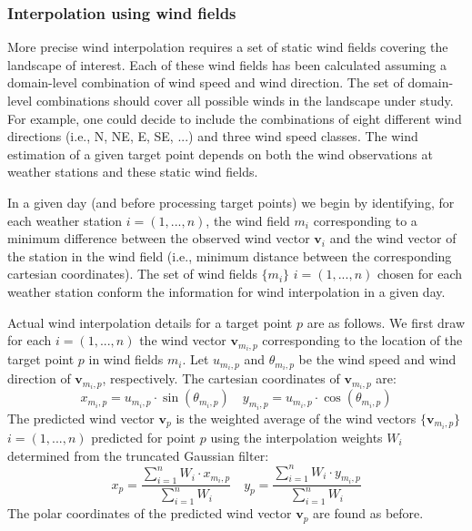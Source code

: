 \documentclass[11pt,a4paper]{article}
\begin{document}
\subsubsection{Interpolation using wind fields}
More precise wind interpolation requires a set of static wind fields covering the landscape of interest. Each of these wind fields has been calculated assuming a domain-level combination of wind speed and wind direction. The set of domain-level combinations should cover all possible winds in the landscape under study. For example, one could decide to include the combinations of eight different wind directions (i.e., N, NE, E, SE, ...) and three wind speed classes. The wind estimation of a given target point depends on both the wind observations at weather stations and these static wind fields.

In a given day (and before processing target points) we begin by identifying, for each weather station $i = (1, ... ,n)$, the wind field $m_i$ corresponding to a minimum difference between the observed wind vector $\mathbf{v}_i$ and the wind vector of the station in the wind field (i.e., minimum distance between the corresponding cartesian coordinates). The set of wind fields $\{m_i\}$ $i = (1, ... ,n)$ chosen for each weather station conform the information for wind interpolation in a given day.

Actual wind interpolation details for a target point $p$ are as follows. We first draw for each $i=(1,... , n)$ the wind vector $\mathbf{v}_{m_i,p}$ corresponding to the location of the target point $p$ in wind fields $m_i$. Let $u_{m_i,p}$ and $\theta_{m_i,p}$ be the wind speed and wind direction of $\mathbf{v}_{m_i,p}$, respectively. The cartesian coordinates of $\mathbf{v}_{m_i,p}$ are:
\begin{equation}
x_{m_i,p} = u_{m_i,p}\cdot \sin(\theta_{m_i,p}) \quad y_{m_i,p} = u_{m_i,p}\cdot \cos(\theta_{m_i,p})
\end{equation}
The predicted wind vector $\mathbf{v}_{p}$ is the weighted average of the wind vectors $\{\mathbf{v}_{m_i,p}\}$  $i=(1,... , n)$ predicted for point $p$ using the interpolation weights $W_i$ determined from the truncated Gaussian filter:
\begin{equation}
x_{p} = \frac{\sum_{i=1}^{n}{W_i \cdot x_{m_i,p}}}{\sum_{i=1}^{n}{W_i}}  \quad y_{p} = \frac{\sum_{i=1}^{n}{W_i \cdot y_{m_i,p}}}{\sum_{i=1}^{n}{W_i}}
\end{equation}
The polar coordinates of the predicted wind vector $\mathbf{v}_{p}$  are found as before.
\end{document}
